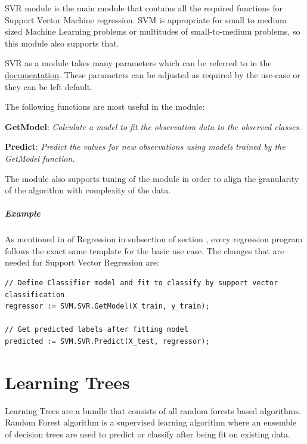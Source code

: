 \documentclass[a4paper,oneside,12pt]{book}
\begin{document}
SVR module is the main module that contains all the required functions for Support Vector Machine regression. SVM is appropriate for small to medium sized Machine Learning problems or multitudes of small-to-medium problems, so this module also supports that. 

SVR as a module takes many parameters which can be referred to in the \href{https://cdn.hpccsystems.com/pdf/ml/SupportVectorMachines.pdf}{documentation}. These parameters can be adjusted as required by the use-case or they can be left default. 

The following functions are most useful in the module:

\textbf{GetModel}: \textit{Calculate a model to fit the observation data to the observed classes.}

\textbf{Predict}: \textit{Predict the values for new observations using models trained by the GetModel function.}

The module also supports tuning of the module in order to align the granularity of the algorithm with complexity of the data.

\paragraph{Example}

As mentioned in  of Regression in  subsection of section , every regression program follows the exact same template for the basic use case. The changes that are needed for Support Vector Regression are:

\begin{lstlisting}
// Define Classifier model and fit to classify by support vector classification
regressor := SVM.SVR.GetModel(X_train, y_train);

// Get predicted labels after fitting model
predicted := SVM.SVR.Predict(X_test, regressor);
\end{lstlisting}

\chapter{Learning Trees}\label{supe:learntrees}

Learning Trees are a bundle that consists of all random forests based algorithms. Random Forest algorithm is a supervised learning algorithm where an ensemble of decision trees are used to predict or classify after being fit on existing data.
\end{document}

